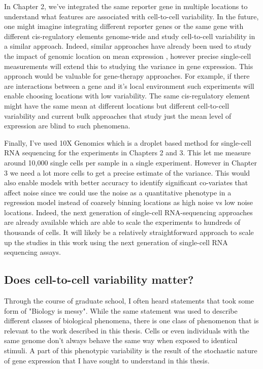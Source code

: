 In Chapter 2, we've integrated the same reporter gene in multiple locations to understand what features are associated with cell-to-cell variability. In the future, one might imagine integrating different reporter genes or the same gene with different cis-regulatory elements genome-wide and study cell-to-cell variability in a similar approach. Indeed, similar approaches have already been used to study the impact of genomic location on mean expression \cite{hong2022gr}, however precise single-cell measurements will extend this to studying the variance in gene expression. This approach would be valuable for gene-therapy approaches. For example, if there are interactions between a gene and it's local environment such experiments will enable choosing locations with low variability. The same cis-regulatory element might have the same mean at different locations but different cell-to-cell variability and current bulk approaches that study just the mean level of expression are blind to such phenomena.

Finally, I've used 10X Genomics which is a droplet based method for single-cell RNA sequencing for the experiments in Chapters 2 and 3. This let me measure around 10,000 single cells per sample in a single experiment. However in Chapter 3 we need a lot more cells to get a precise estimate of the variance. This would also enable models with better accuracy to identify significant co-variates that affect noise since we could use the noise as a quantitative phenotype in a regression model instead of coarsely binning locations as high noise vs low noise locations. Indeed, the next generation of single-cell RNA-sequencing approaches are already available \cite{caoj_shendurej:ComprehensiveSinglecell2017} which are able to scale the experiments to hundreds of thousands of cells. It will likely be a relatively straightforward approach to scale up the studies in this work using the next generation of single-cell RNA sequencing assays. 

\subsection{Does cell-to-cell variability matter?}

Through the course of graduate school, I often heard statements that took some form of "Biology is messy". While the same statement was used to describe different classes of biological phenomena, there is one class of phenomenon that is relevant to the work described in this thesis. Cells or even individuals with the same genome don't always behave the same way when exposed to identical stimuli. A part of this phenotypic variability is the result of the stochastic nature of gene expression that I have sought to understand in this thesis.

